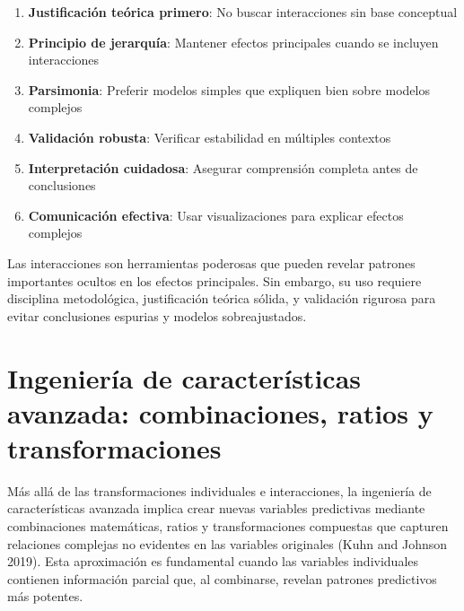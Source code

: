 \documentclass[
  letterpaper,
  DIV=11,
  numbers=noendperiod]{scrreprt}
\providecommand{\tightlist}{%
  \setlength{\itemsep}{0pt}\setlength{\parskip}{0pt}}
\begin{document}
\begin{tcolorbox}[enhanced jigsaw, breakable, toprule=.15mm, bottomtitle=1mm, coltitle=black, colbacktitle=quarto-callout-important-color!10!white, titlerule=0mm, opacitybacktitle=0.6, bottomrule=.15mm, toptitle=1mm, title=\textcolor{quarto-callout-important-color}{\faExclamation}\hspace{0.5em}{Principios para el uso de interacciones}, arc=.35mm, rightrule=.15mm, opacityback=0, colframe=quarto-callout-important-color-frame, leftrule=.75mm, left=2mm, colback=white]

\begin{enumerate}
\def\labelenumi{\arabic{enumi}.}
\tightlist
\item
  \textbf{Justificación teórica primero}: No buscar interacciones sin
  base conceptual
\item
  \textbf{Principio de jerarquía}: Mantener efectos principales cuando
  se incluyen interacciones
\item
  \textbf{Parsimonia}: Preferir modelos simples que expliquen bien sobre
  modelos complejos
\item
  \textbf{Validación robusta}: Verificar estabilidad en múltiples
  contextos
\item
  \textbf{Interpretación cuidadosa}: Asegurar comprensión completa antes
  de conclusiones
\item
  \textbf{Comunicación efectiva}: Usar visualizaciones para explicar
  efectos complejos
\end{enumerate}

\end{tcolorbox}

Las interacciones son herramientas poderosas que pueden revelar patrones
importantes ocultos en los efectos principales. Sin embargo, su uso
requiere disciplina metodológica, justificación teórica sólida, y
validación rigurosa para evitar conclusiones espurias y modelos
sobreajustados.

\section{Ingeniería de características avanzada: combinaciones, ratios y
transformaciones}\label{ingenieruxeda-de-caracteruxedsticas-avanzada-combinaciones-ratios-y-transformaciones}

Más allá de las transformaciones individuales e interacciones, la
ingeniería de características avanzada implica crear nuevas variables
predictivas mediante combinaciones matemáticas, ratios y
transformaciones compuestas que capturen relaciones complejas no
evidentes en las variables originales (Kuhn and Johnson 2019). Esta
aproximación es fundamental cuando las variables individuales contienen
información parcial que, al combinarse, revelan patrones predictivos más
potentes.
\end{document}
